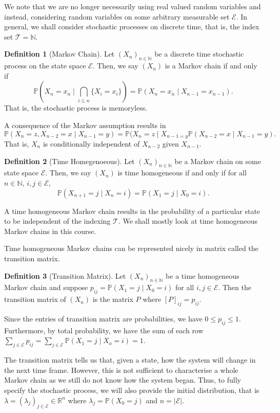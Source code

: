 \documentclass[
]{article}
\theoremstyle{definition}
\newtheorem{definition}{Definition}[section]
\begin{document}
We note that we are no longer necessarily using real valued random
variables and instead, considering random variables on some arbitrary
measurable set \(\mathcal{E}\). In general, we shall consider stochastic
processes on discrete time, that is, the index set
\(\mathcal{T} = \mathbb{N}\).

\begin{definition}[Markov Chain]
  Let \((X_n)_{n \in \mathbb{N}}\) be a discrete time stochastic process on 
  the state space \(\mathcal{E}\). Then, we say \((X_n)\) is a Markov chain if 
  and only if 
  \[\mathbb{P}(X_n = x_n \mid \bigcap_{i \le n} \{X_i = x_i\}) = 
    \mathbb{P}(X_n = x_n \mid X_{n - 1} = x_{n - 1}).\]
  That is, the stochastic process is memoryless.
\end{definition}

A consequence of the Markov assumption results in
\[\mathbb{P}(X_n = z, X_{n - 2} = x \mid X_{n - 1} = y) = 
  \mathbb{P}(X_n = z \mid X_{n - 1 = y}\mathbb{P}(X_{n - 2} = x \mid X_{n - 1} = y).\]
That is, \(X_n\) is conditionally independent of \(X_{n - 2}\) given
\(X_{n - 1}\).

\begin{definition}[Time Homegenoeous]
  Let \((X_n)_{n \in \mathbb{N}}\) be a Markov chain on some state space 
  \(\mathcal{E}\). Then, we say \((X_n)\) is time homogeneous if and only if 
  for all \(n \in \mathbb{N}\), \(i, j \in \mathcal{E}\), 
  \[\mathbb{P}(X_{n + 1} = j \mid X_n = i) = \mathbb{P}(X_1 = j \mid X_0 = i).\]
\end{definition}

A time homogeneous Markov chain results in the probability of a
particular state to be independent of the indexing \(\mathcal{T}\). We
shall mostly look at time homogeneous Markov chains in this course.

Time homogeneous Markov chains can be represented nicely in matrix
called the transition matrix.

\begin{definition}[Transition Matrix]
  Let \((X_n)_{n \in \mathbb{N}}\) be a time homogeneous Markov chain and suppose 
  \(p_{ij} = \mathbb{P}(X_1 = j \mid X_0 = i)\) for all \(i, j \in \mathcal{E}\). 
  Then the transition matrix of \((X_n)\) is the matrix \(P\) where 
  \([P]_{ij} = p_{ij}\).
\end{definition}

Since the entries of transition matrix are probabilities, we have
\(0 \le p_{ij} \le 1\). Furthermore, by total probability, we have the
sum of each row
\(\sum_{j \in \mathcal{E}} p_{ij} =  \sum_{j \in \mathcal{E}} \mathbb{P}(X_1 = j \mid X_o = i) = 1\).

The transition matrix tells us that, given a state, how the system will
change in the next time frame. However, this is not sufficient to
characterise a whole Markov chain as we still do not know how the system
began. Thus, to fully specify the stochastic process, we will also
provide the initial distribution, that is
\(\lambda = (\lambda_j)_{j \in \mathcal{E}} \in \mathbb{R}^n\) where
\(\lambda_j = \mathbb{P}(X_0 = j)\) and
\(n = \left| \mathcal{E} \right|\).
\end{document}
